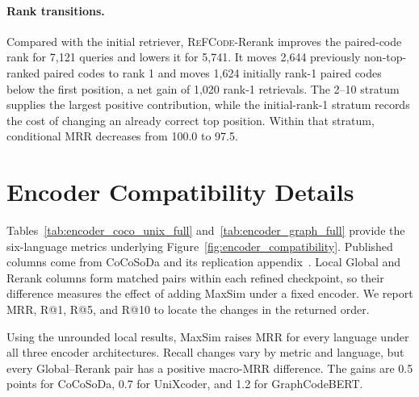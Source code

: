 \documentclass[11pt]{article}
\newcommand{\method}{\textsc{ReFCode}}
\begin{document}
\paragraph{Rank transitions.}
Compared with the initial retriever, \method{}-Rerank improves the paired-code rank for 7,121 queries and lowers it for 5,741. It moves 2,644 previously non-top-ranked paired codes to rank 1 and moves 1,624 initially rank-1 paired codes below the first position, a net gain of 1,020 rank-1 retrievals. The 2--10 stratum supplies the largest positive contribution, while the initial-rank-1 stratum records the cost of changing an already correct top position. Within that stratum, conditional MRR decreases from 100.0 to 97.5.

\section{Encoder Compatibility Details}
\label{app:encoder_instantiations}

Tables~\ref{tab:encoder_coco_unix_full} and~\ref{tab:encoder_graph_full} provide the six-language metrics underlying Figure~\ref{fig:encoder_compatibility}. Published columns come from CoCoSoDa and its replication appendix~\citep{CoCoSoDa}. Local Global and Rerank columns form matched pairs within each refined checkpoint, so their difference measures the effect of adding MaxSim under a fixed encoder. We report MRR, R@1, R@5, and R@10 to locate the changes in the returned order.

Using the unrounded local results, MaxSim raises MRR for every language under all three encoder architectures. Recall changes vary by metric and language, but every Global--Rerank pair has a positive macro-MRR difference. The gains are 0.5 points for CoCoSoDa, 0.7 for UniXcoder, and 1.2 for GraphCodeBERT.
\end{document}
